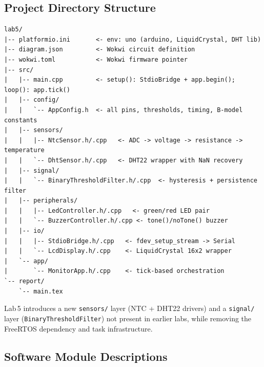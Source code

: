 \documentclass[12pt]{article}
\begin{document}
\subsection{Project Directory Structure}

\begin{verbatim}
lab5/
|-- platformio.ini       <- env: uno (arduino, LiquidCrystal, DHT lib)
|-- diagram.json         <- Wokwi circuit definition
|-- wokwi.toml           <- Wokwi firmware pointer
|-- src/
|   |-- main.cpp         <- setup(): StdioBridge + app.begin(); loop(): app.tick()
|   |-- config/
|   |   `-- AppConfig.h  <- all pins, thresholds, timing, B-model constants
|   |-- sensors/
|   |   |-- NtcSensor.h/.cpp   <- ADC -> voltage -> resistance -> temperature
|   |   `-- DhtSensor.h/.cpp   <- DHT22 wrapper with NaN recovery
|   |-- signal/
|   |   `-- BinaryThresholdFilter.h/.cpp  <- hysteresis + persistence filter
|   |-- peripherals/
|   |   |-- LedController.h/.cpp   <- green/red LED pair
|   |   `-- BuzzerController.h/.cpp <- tone()/noTone() buzzer
|   |-- io/
|   |   |-- StdioBridge.h/.cpp   <- fdev_setup_stream -> Serial
|   |   `-- LcdDisplay.h/.cpp    <- LiquidCrystal 16x2 wrapper
|   `-- app/
|       `-- MonitorApp.h/.cpp    <- tick-based orchestration
`-- report/
    `-- main.tex
\end{verbatim}

Lab\,5 introduces a new \texttt{sensors/} layer (NTC + DHT22 drivers) and a \texttt{signal/} layer (\texttt{BinaryThresholdFilter}) not present in earlier labs, while removing the FreeRTOS dependency and task infrastructure.

\subsection{Software Module Descriptions}
\end{document}
